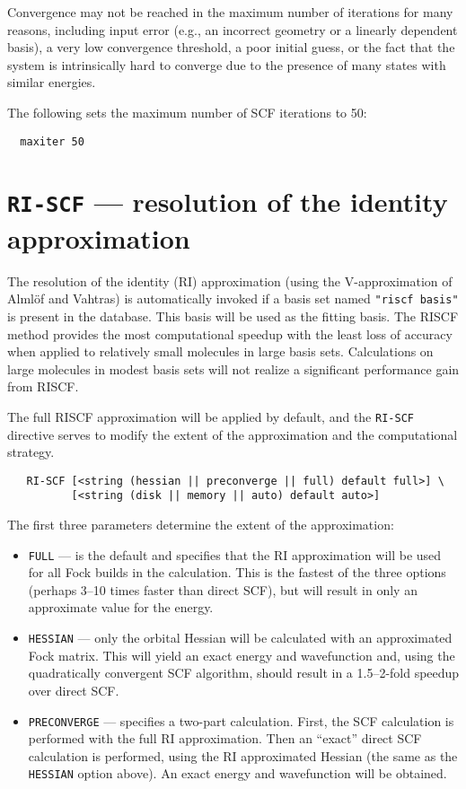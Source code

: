 \fussy

Convergence may not be reached in the maximum number of iterations for
many reasons, including input error (e.g., an incorrect geometry or a
linearly dependent basis), a very low convergence threshold, a poor
initial guess, or the fact that the system is intrinsically hard to
converge due to the presence of many states with similar energies.

The following sets the maximum number of SCF iterations to 50:
\begin{verbatim}
  maxiter 50
\end{verbatim}

\section{{\tt RI-SCF} --- resolution of the identity approximation}
\label{sec:riscf}

The resolution of the identity (RI) approximation (using the
V-approximation of Alml\"{o}f and Vahtras) is automatically invoked if
a basis set named \verb+"riscf basis"+ is present in the database.
This basis will be used as the fitting basis.  The RISCF method
provides the most computational speedup with the least loss of
accuracy when applied to relatively small molecules in large basis
sets.  Calculations on large molecules in modest basis sets will not
realize a significant performance gain from RISCF.

The full RISCF approximation will be applied by default, and the
\verb+RI-SCF+ directive serves to modify the extent of the approximation
and the computational strategy.

\begin{verbatim}
   RI-SCF [<string (hessian || preconverge || full) default full>] \
          [<string (disk || memory || auto) default auto>]
\end{verbatim}

The first three parameters determine the extent of the approximation:
\begin{itemize} 
\item \verb+FULL+ --- is the default and specifies that the RI
  approximation will be used for all Fock builds in the calculation.
  This is the fastest of the three options (perhaps 3--10 times faster
  than direct SCF), but will result in only an approximate value for
  the energy.

\item \verb+HESSIAN+ --- only the orbital Hessian will be calculated
  with an approximated Fock matrix.  This will yield an exact energy
  and wavefunction and, using the quadratically convergent SCF
  algorithm, should result in a 1.5--2-fold speedup over direct SCF.

\item \verb+PRECONVERGE+ --- specifies a two-part calculation.  First,
  the SCF calculation is performed with the full RI
  approximation.  Then an ``exact'' direct SCF calculation is performed, 
using the RI approximated Hessian (the same as the 
  \verb+HESSIAN+ option above).  An exact energy and wavefunction will be
  obtained.
\end{itemize}

